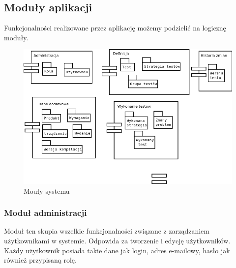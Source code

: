 \subsection{Moduły aplikacji}
Funkcjonalności realizowane przez aplikację możemy podzielić na logicznę moduły.
\begin{figure}[h]
\centerline{\includegraphics[scale=0.5]{img/komponenty.png}}
\caption{Mouły systemu}
\label{fig:moduly}
\end{figure}

\subsubsection{Moduł administracji}

Moduł ten skupia wszelkie funkcjonalności związane z zarządzaniem użytkownikami w systemie. Odpowida za tworzenie i edycję użytkowników. Każdy użytkownik posiada takie dane jak login, adres e-mailowy, hasło jak również przypisaną rolę.

